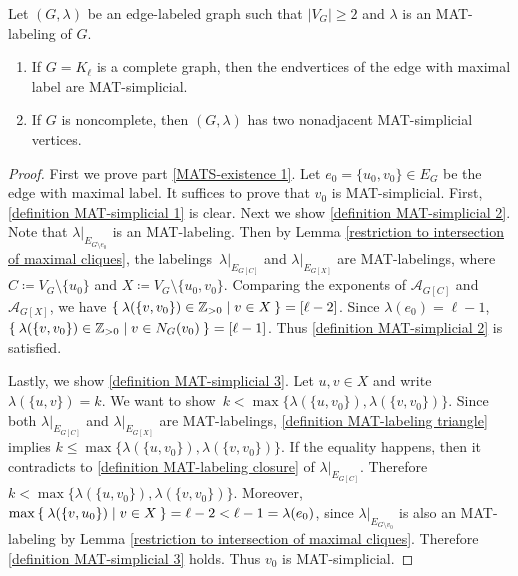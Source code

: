 \documentclass[ALCO, Unicode,published]{cedram}
\begin{document}
\begin{lemma}
\label{lem:MATS-existence}
Let $ (G, \lambda) $ be an edge-labeled graph such that $ |V_{G}| \geq 2 $ and $ \lambda $ is an MAT-labeling of $ G $. 
\begin{enumerate}[(1)]
\item\label{MATS-existence 1} If $ G = K_{\ell} $ is a complete graph, then the endvertices of the edge with maximal label are MAT-simplicial. 
\item\label{MATS-existence 2} 
If $ G $ is noncomplete, then $ (G, \lambda) $ has two nonadjacent MAT-simplicial vertices. 
\end{enumerate}
\end{lemma}
\begin{proof}
First we prove part \ref{MATS-existence 1}. 
Let $ e_{0} = \{u_{0}, v_{0}\} \in E_{G} $ be the edge with maximal label. 
It suffices to prove that $ v_{0} $ is MAT-simplicial. 
First, \ref{definition MAT-simplicial 1} is clear. 
Next we show \ref{definition MAT-simplicial 2}. 
Note that $ \lambda|_{E_{G\setminus e_0}} $ is an MAT-labeling.
Then by Lemma \ref{restriction to intersection of maximal cliques}, the labelings~$ \lambda|_{E_{G[C]}} $ and $ \lambda|_{E_{G[X]}} $ are MAT-labelings, where $ C \coloneqq V_{G}\setminus\{u_{0}\} $ and $ X \coloneqq V_{G} \setminus \{u_{0}, v_{0}\} $. 
Comparing the exponents of $ \mathcal{A}_{G[C]} $ and $ \mathcal{A}_{G[X]} $, we have $ \Set{\lambda(\{v, v_{0}\}) \in \mathbb{Z}_{>0} | v \in X } = [\ell -2] $. 
Since $ \lambda(e_{0}) = \ell -1 $, $ \Set{\lambda(\{v, v_{0}\}) \in \mathbb{Z}_{>0} | v \in N_{G}(v_{0}) } = [\ell -1] $.
Thus \ref{definition MAT-simplicial 2} is satisfied. 

Lastly,  we show \ref{definition MAT-simplicial 3}. 
Let $ u,v \in X $ and write $ \lambda(\{u,v\}) = k $. 
We want to show~$ k<\max\{\lambda(\{u,v_{0}\}), \lambda(\{v,v_{0}\})\} $. 
Since both $ \lambda|_{E_{G[C]}} $ and $ \lambda|_{E_{G[X]}} $ are MAT-labelings, \ref{definition MAT-labeling triangle} implies $ k \leq \max\{\lambda(\{u,v_{0}\}), \lambda(\{v,v_{0}\})\} $. 
If the equality happens, then it contradicts to \ref{definition MAT-labeling closure} of $ \lambda|_{E_{G[C]}} $. 
Therefore $ k < \max\{\lambda(\{u,v_{0}\}), \lambda(\{v,v_{0}\})\} $. 
Moreover, $ \max\Set{\lambda(\{v,u_{0}\}) | v \in X} = \ell -2 < \ell - 1 = \lambda(e_{0}) $, since $ \lambda|_{E_{G\setminus v_{0}}} $ is also an MAT-labeling by Lemma \ref{restriction to intersection of maximal cliques}. 
Therefore \ref{definition MAT-simplicial 3} holds. 
Thus $ v_0 $ is MAT-simplicial. 


\end{proof}
\end{document}
